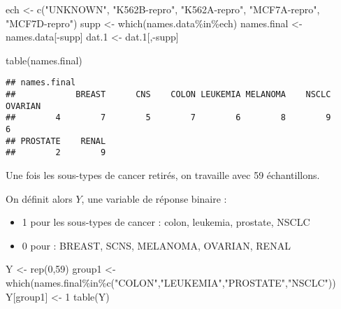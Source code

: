 \documentclass[
]{article}
\newenvironment{Shaded}{\begin{snugshade}}{\end{snugshade}}
\newcommand{\DecValTok}[1]{\textcolor[rgb]{0.00,0.00,0.81}{#1}}
\newcommand{\FloatTok}[1]{\textcolor[rgb]{0.00,0.00,0.81}{#1}}
\newcommand{\FunctionTok}[1]{\textcolor[rgb]{0.00,0.00,0.00}{#1}}
\newcommand{\NormalTok}[1]{#1}
\newcommand{\OtherTok}[1]{\textcolor[rgb]{0.56,0.35,0.01}{#1}}
\newcommand{\SpecialCharTok}[1]{\textcolor[rgb]{0.00,0.00,0.00}{#1}}
\newcommand{\StringTok}[1]{\textcolor[rgb]{0.31,0.60,0.02}{#1}}
\providecommand{\tightlist}{%
  \setlength{\itemsep}{0pt}\setlength{\parskip}{0pt}}
\begin{document}
\begin{Shaded}
\begin{Highlighting}[]
\NormalTok{ech }\OtherTok{\textless{}{-}} \FunctionTok{c}\NormalTok{(}\StringTok{"UNKNOWN"}\NormalTok{, }\StringTok{"K562B{-}repro"}\NormalTok{, }\StringTok{"K562A{-}repro"}\NormalTok{, }\StringTok{"MCF7A{-}repro"}\NormalTok{, }\StringTok{"MCF7D{-}repro"}\NormalTok{)}
\NormalTok{supp }\OtherTok{\textless{}{-}} \FunctionTok{which}\NormalTok{(names.data}\SpecialCharTok{\%in\%}\NormalTok{ech)}
\NormalTok{names.final }\OtherTok{\textless{}{-}}\NormalTok{ names.data[}\SpecialCharTok{{-}}\NormalTok{supp]}
\NormalTok{dat}\FloatTok{.1} \OtherTok{\textless{}{-}}\NormalTok{ dat}\FloatTok{.1}\NormalTok{[,}\SpecialCharTok{{-}}\NormalTok{supp]}
\end{Highlighting}
\end{Shaded}

\begin{Shaded}
\begin{Highlighting}[]
\FunctionTok{table}\NormalTok{(names.final)}
\end{Highlighting}
\end{Shaded}

\begin{verbatim}
## names.final
##            BREAST      CNS    COLON LEUKEMIA MELANOMA    NSCLC  OVARIAN 
##        4        7        5        7        6        8        9        6 
## PROSTATE    RENAL 
##        2        9
\end{verbatim}

Une fois les sous-types de cancer retirés, on travaille avec 59
échantillons.

On définit alors \(Y\), une variable de réponse binaire :

\begin{itemize}
\tightlist
\item
  1 pour les sous-types de cancer : colon, leukemia, prostate, NSCLC
\item
  0 pour : BREAST, SCNS, MELANOMA, OVARIAN, RENAL
\end{itemize}

\begin{Shaded}
\begin{Highlighting}[]
\NormalTok{Y }\OtherTok{\textless{}{-}} \FunctionTok{rep}\NormalTok{(}\DecValTok{0}\NormalTok{,}\DecValTok{59}\NormalTok{)}
\NormalTok{group1 }\OtherTok{\textless{}{-}} \FunctionTok{which}\NormalTok{(names.final}\SpecialCharTok{\%in\%}\FunctionTok{c}\NormalTok{(}\StringTok{"COLON"}\NormalTok{,}\StringTok{"LEUKEMIA"}\NormalTok{,}\StringTok{"PROSTATE"}\NormalTok{,}\StringTok{"NSCLC"}\NormalTok{))}
\NormalTok{Y[group1] }\OtherTok{\textless{}{-}} \DecValTok{1}
\FunctionTok{table}\NormalTok{(Y)}
\end{Highlighting}
\end{Shaded}
\end{document}
